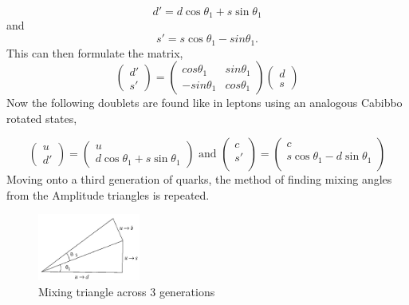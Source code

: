 \begin{equation}\label{wd}
d' =d\cos\theta_1 +s\sin\theta_1
\end{equation}
 and
\begin{equation}\label{ws}
s'=s\cos\theta_1 -sin\theta_1.
\end{equation}
This can then formulate the matrix,
\begin{equation}\label{mix}
 \left( \begin{array}{c} d' \\  s' \end{array} \right)  = \left( \begin{array}{ccc} cos\theta_1 & sin\theta_1 \\ -sin\theta_1 & cos\theta_1 \end{array}\right) \left( \begin{array}{c} d \\  s \end{array} \right)
\end{equation}
Now the following doublets are found like in leptons using an analogous Cabibbo rotated states,

\begin{equation}\label{mix1}
\left( \begin{array}{c}
 u \\ d'
 \end{array} \right)  = 
\left( \begin{array}{c}
 u \\ d\cos\theta_1 +s\sin\theta_1
 \end{array} \right) \mbox{ and }
 \left( \begin{array}{c}
 c \\ s' \\
 \end{array} \right)  =
 \left( \begin{array}
{c} c \\
 s\cos\theta_1 -d \sin\theta_1 \\
 \end{array}
\right)
\end{equation}
Moving onto a third generation of quarks, the method of finding mixing angles from the Amplitude triangles is repeated.
\begin{figure}[h]
\includegraphics[width=0.3\textwidth]{figs/ckmfig4a.jpg}
\caption{Mixing triangle across 3 generations}
\label{tri3}
\end{figure}

